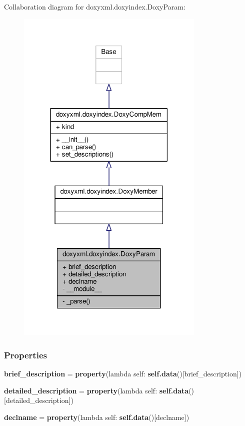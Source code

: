 Collaboration diagram for doxyxml.\+doxyindex.\+Doxy\+Param\+:
\nopagebreak
\begin{figure}[H]
\begin{center}
\leavevmode
\includegraphics[width=255pt]{dd/d04/classdoxyxml_1_1doxyindex_1_1DoxyParam__coll__graph}
\end{center}
\end{figure}
\subsubsection*{Properties}
\begin{DoxyCompactItemize}
\item 
{\bf brief\+\_\+description} = {\bf property}(lambda self\+: {\bf self.\+data}()[\textquotesingle{}brief\+\_\+description\textquotesingle{}])
\item 
{\bf detailed\+\_\+description} = {\bf property}(lambda self\+: {\bf self.\+data}()[\textquotesingle{}detailed\+\_\+description\textquotesingle{}])
\item 
{\bf declname} = {\bf property}(lambda self\+: {\bf self.\+data}()[\textquotesingle{}declname\textquotesingle{}])
\end{DoxyCompactItemize}
